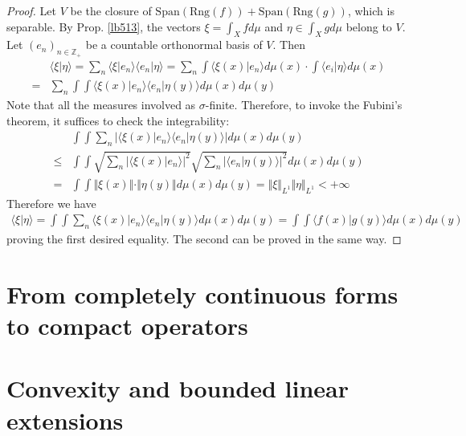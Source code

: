 \documentclass[12pt,b5paper,notitlepage]{article}
\theoremstyle{definition}
\theoremstyle{plain}
\newcommand{\Span}{\mathrm{Span}}
\newcommand{\bk}[1]{\langle {#1}\rangle}
\newcommand{\Zbb}{\mathbb Z}
\newcommand{\Rng}{\mathrm{Rng}}
\numberwithin{equation}{section}
\begin{document}
\begin{subappendices}
\begin{proof}
Let $V$ be the closure of $\Span(\Rng(f))+\Span(\Rng(g))$, which is separable. By Prop. \ref{lb513}, the vectors $\xi=\int_Xfd\mu$ and $\eta\in\int_X gd\mu$ belong to $V$. Let $(e_n)_{n\in\Zbb_+}$ be a countable orthonormal basis of $V$. Then
\begin{align*}
&\bk{\xi|\eta}=\sum_n\bk{\xi|e_n}\bk{e_n|\eta}=\sum_n\int\bk{\xi(x)|e_n}d\mu(x)\cdot \int\bk{e_i|\eta}d\mu(x)\\
=&\sum_n\int\int \bk{\xi(x)|e_n}\bk{e_n|\eta(y)}d\mu(x)d\mu(y)
\end{align*}
Note that all the measures involved as $\sigma$-finite. Therefore, to invoke the Fubini's theorem, it suffices to check the integrability:
\begin{align*}
&\int\int\sum_n |\bk{\xi(x)|e_n}\bk{e_n|\eta(y)}|d\mu(x)d\mu(y)\\
\leq&\int\int \sqrt{\sum_n |\bk{\xi(x)|e_n}|^2}\sqrt{\sum_n|\bk{e_n|\eta(y)}|^2}d\mu(x)d\mu(y)\\
=&\int\int \Vert\xi(x)\Vert\cdot\Vert\eta(y)\Vert d\mu(x)d\mu(y)=\Vert\xi\Vert_{L^1}\Vert\eta\Vert_{L^1}<+\infty
\end{align*}
Therefore we have
\begin{align*}
\bk{\xi|\eta}=\int\int\sum_n\bk{\xi(x)|e_n}\bk{e_n|\eta(y)}d\mu(x)d\mu(y)=\int\int\bk{f(x)|g(y)}d\mu(x)d\mu(y)
\end{align*}
proving the first desired equality. The second can be proved in the same way.
\end{proof}









\end{subappendices}








\newpage



\section{From completely continuous forms to compact operators}\label{lb355}


\newpage

\section{Convexity and bounded linear extensions}
\end{document}
